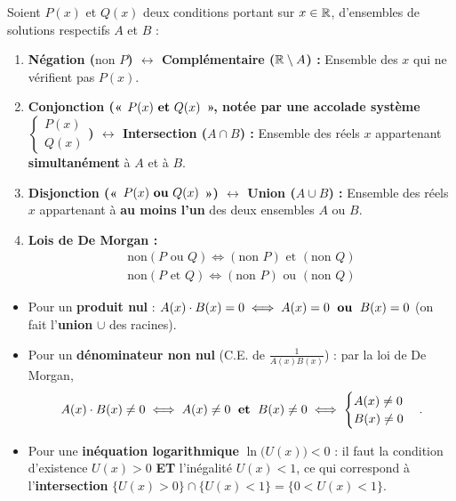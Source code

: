 \begin{theoreme}
Soient $P(x)$ et $Q(x)$ deux conditions portant sur $x \in \mathbb{R}$, d'ensembles de solutions respectifs $A$ et $B$ :
\begin{enumerate}
    \item \textbf{Négation ($\text{non } P$) $\longleftrightarrow$ Complémentaire ($\mathbb{R} \setminus A$) :} Ensemble des $x$ qui ne vérifient pas $P(x)$.
    \item \textbf{Conjonction (« $P(x) \text{ \textbf{et} } Q(x)$ », notée par une accolade système $\begin{cases} P(x) \\ Q(x) \end{cases}$) $\longleftrightarrow$ Intersection ($A \cap B$) :}
    Ensemble des réels $x$ appartenant \textbf{simultanément} à $A$ et à $B$.
    \item \textbf{Disjonction (« $P(x) \text{ \textbf{ou} } Q(x)$ ») $\longleftrightarrow$ Union ($A \cup B$) :}
    Ensemble des réels $x$ appartenant à \textbf{au moins l'un} des deux ensembles $A$ ou $B$.
    \item \textbf{Lois de De Morgan :}
    \begin{align*}
        \boxed{\text{non}(P \text{ ou } Q) \iff (\text{non } P) \text{ et } (\text{non } Q)} \\
        \boxed{\text{non}(P \text{ et } Q) \iff (\text{non } P) \text{ ou } (\text{non } Q)}
    \end{align*}
\end{enumerate}
\end{theoreme}

\begin{attention}
\begin{itemize}
    \item Pour un \textbf{produit nul} : $A(x)\cdot B(x) = 0 \iff A(x) = 0 \;\text{ \textbf{ou} }\; B(x) = 0$ (on fait l'\textbf{union} $\cup$ des racines).
    \item Pour un \textbf{dénominateur non nul} (C.E. de $\frac{1}{A(x)B(x)}$) : par la loi de De Morgan,
    \[
        A(x)\cdot B(x) \neq 0 \iff A(x) \neq 0 \;\text{ \textbf{et} }\; B(x) \neq 0 \iff \begin{cases} A(x) \neq 0 \\ B(x) \neq 0 \end{cases}.
    \]
    \item Pour une \textbf{inéquation logarithmique} $\ln\bigl(U(x)\bigr) < 0$ : il faut la condition d'existence $U(x) > 0$ \textbf{ET} l'inégalité $U(x) < 1$, ce qui correspond à l'\textbf{intersection} $\{U(x) > 0\} \cap \{U(x) < 1\} = \{0 < U(x) < 1\}$.
\end{itemize}
\end{attention}

